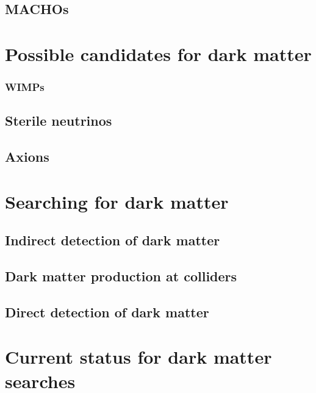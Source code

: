 \subsection{MACHOs}\label{sec:DMOverview/MACHOs}

\section{Possible candidates for dark matter}\label{sec:DMOverview/Candidates4DM}

\subsubsection{WIMPs}\label{sec:DMOverview/WIMPs}

\subsection{Sterile neutrinos}\label{sec:DMOverview/Neutrinos}

\subsection{Axions}\label{sec:DMOverview/Axions}

\section{Searching for dark matter}\label{sec:DMOverview/DetectionOfDM}

\subsection{Indirect detection of dark matter}\label{sec:DMOverview/IndirectDM}

\subsection{Dark matter production at colliders}\label{sec:DMOverview/DMProdColliders}

\subsection{Direct detection of dark matter}\label{sec:DMOverview/DirectDetection}

\section{Current status for dark matter searches}\label{sec:DMOverview/DMCurrentStatus}